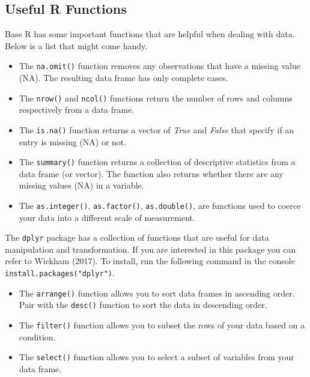 \documentclass[
  letterpaper,
  DIV=11,
  numbers=noendperiod]{scrreprt}
\providecommand{\tightlist}{%
  \setlength{\itemsep}{0pt}\setlength{\parskip}{0pt}}\usepackage{longtable,booktabs,array}
\begin{document}
\hypertarget{useful-r-functions}{%
\subsection*{Useful R Functions}\label{useful-r-functions}}

Base R has some important functions that are helpful when dealing with
data. Below is a list that might come handy.

\begin{itemize}
\tightlist
\item
  The \texttt{na.omit()} function removes any observations that have a
  missing value (NA). The resulting data frame has only complete cases.
\item
  The \texttt{nrow()} and \texttt{ncol()} functions return the number of
  rows and columns respectively from a data frame.
\item
  The \texttt{is.na()} function returns a vector of \emph{True} and
  \emph{False} that specify if an entry is missing (NA) or not.
\item
  The \texttt{summary()} function returns a collection of descriptive
  statistics from a data frame (or vector). The function also returns
  whether there are any missing values (NA) in a variable.
\item
  The \texttt{as.integer()}, \texttt{as.factor()}, \texttt{as.double()},
  are functions used to coerce your data into a different scale of
  measurement.
\end{itemize}

The \texttt{dplyr} package has a collection of functions that are useful
for data manipulation and transformation. If you are interested in this
package you can refer to Wickham (2017). To install, run the following
command in the console \texttt{install.packages("dplyr")}.

\begin{itemize}
\tightlist
\item
  The \texttt{arrange()} function allows you to sort data frames in
  ascending order. Pair with the \texttt{desc()} function to sort the
  data in descending order.
\item
  The \texttt{filter()} function allows you to subset the rows of your
  data based on a condition.
\item
  The \texttt{select()} function allows you to select a subset of
  variables from your data frame.
\end{itemize}
\end{document}
